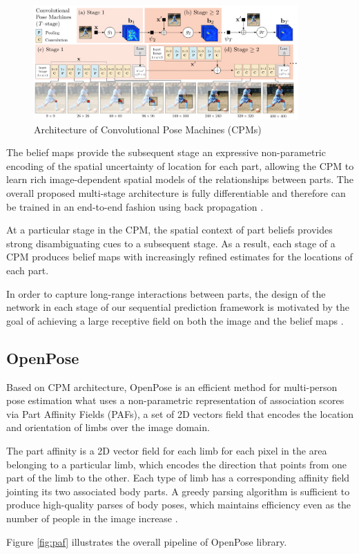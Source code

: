 \begin{figure}[htbp]
\centering\includegraphics[width=0.9\textwidth]{./img/eft.png}
  \caption[Architecture of Convolutional Pose Machines (CPMs)]{Architecture of Convolutional Pose Machines (CPMs) \cite{Wei2016}}\label{fig:eft}
\end{figure}

\par The belief maps provide the subsequent stage an expressive non-parametric encoding of the spatial uncertainty of location for each part, allowing the CPM to learn rich image-dependent spatial models of the relationships between parts. The overall proposed multi-stage architecture is fully differentiable and therefore can be trained in an end-to-end fashion using back propagation \cite{Wei2016}.
\par At a particular stage in the CPM, the spatial context of part beliefs provides strong disambiguating cues to a subsequent stage. As a result, each stage of a CPM produces belief maps with increasingly refined estimates for the locations of each part.
\par In order to capture long-range interactions between parts, the design of the network in each stage of our sequential prediction framework is motivated by the goal of achieving a large receptive field on both the image and the belief maps \cite{Wei2016}.

\subsection*{OpenPose}
\par Based on CPM architecture, OpenPose is an efficient method for multi-person pose estimation what uses a non-parametric representation of association scores via Part Affinity Fields (PAFs), a set of 2D vectors field that encodes the location and orientation of limbs over the image domain.
\par The part affinity is a 2D vector field for each limb for each pixel in the area belonging to a particular limb, which encodes the direction that points from one part of the limb to the other. Each type of limb has a corresponding affinity field jointing its two associated body parts. A greedy parsing algorithm is sufficient to produce high-quality parses of body poses, which maintains efficiency even as the number of people in the image increase \cite{cao2017realtime}.
\par Figure \ref{fig:paf} illustrates the overall pipeline of OpenPose library.

